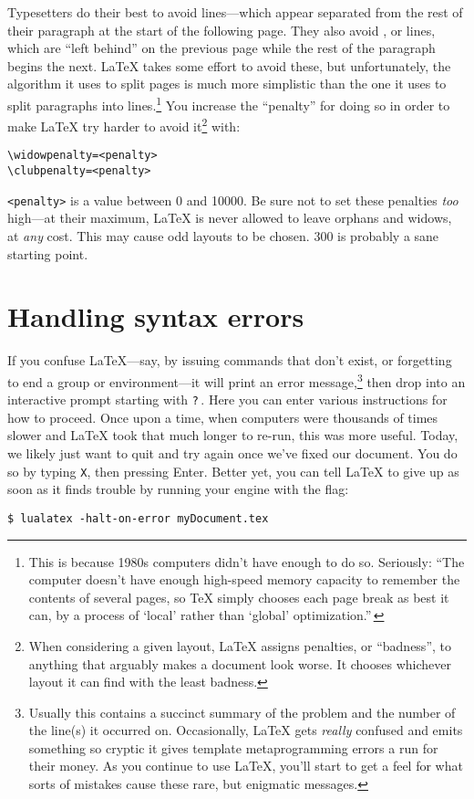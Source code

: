 Typesetters do their best to avoid  lines---which appear
separated from the rest of their paragraph at the start of the following
page.
They also avoid , or  lines,
which are ``left behind'' on the previous page while the rest of the paragraph
begins the next.
\LaTeX{} takes some effort to avoid these, but unfortunately, the algorithm it
uses to split pages is much more simplistic than the one it uses
to split paragraphs into lines.\punckern\footnote{This is because
1980s computers didn't have enough  to do so. Seriously:
``The computer doesn't have enough high-speed memory capacity to remember the
contents of several pages,
so \TeX{} simply chooses each page break as best it can, by a process of
`local' rather than `global' optimization.\quotekern''\,}
You increase the ``penalty'' for doing so in order to make \LaTeX{}
try harder to avoid it\footnote{When considering a given layout,
\LaTeX{} assigns penalties, or ``badness''\quotekern,
to anything that arguably makes a document look worse.
It chooses whichever layout it can find with the least badness.}
with:
\begin{leftfigure}
\begin{lstlisting}
\widowpenalty=<penalty>
\clubpenalty=<penalty>
\end{lstlisting}
\end{leftfigure}
\verb|<penalty>| is a value between 0 and 10000.
Be sure not to set these penalties \emph{too} high---at their maximum,
\LaTeX{} is never allowed to leave orphans and widows, at \emph{any} cost.
This may cause odd layouts to be chosen.
300 is probably a sane starting point.

\section{Handling syntax errors}
If you confuse \LaTeX{}---say, by issuing commands that don't exist,
or forgetting to end a group or environment---it will print an
error message,\punckern\footnote{Usually this contains a succinct summary of
the problem and the number of the line(s) it occurred on. Occasionally,
\LaTeX{} gets \emph{really} confused and emits something so cryptic it gives
\cpp{} template metaprogramming errors a run for their money.
As you continue to use \LaTeX, you'll start to get a feel for what sorts of
mistakes cause these rare, but enigmatic messages.}
then drop into an interactive prompt starting with \texttt{?}\,.
Here you can enter various instructions for how to proceed.
Once upon a time, when computers were thousands of times slower and
\LaTeX{} took that much longer to re-run, this was more useful.
Today, we likely just want to quit and try again once we've fixed our document.
You do so by typing \texttt{X}, then pressing Enter.
Better yet, you can tell \LaTeX{} to give up as soon as it finds trouble
by running your engine with the  flag:
\begin{leftfigure}
\begin{lstlisting}
$ lualatex -halt-on-error myDocument.tex
\end{lstlisting}
\end{leftfigure}
